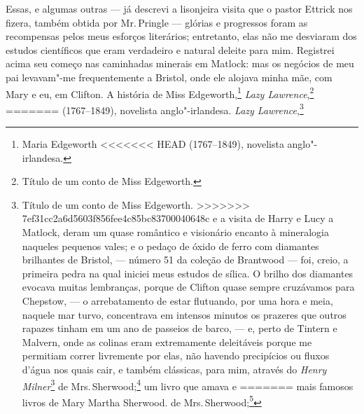 {{{{{{{{{{{{{{{{{{{{{{{%
Essas, e algumas outras --- já descrevi a lisonjeira visita que o
pastor Ettrick nos fizera, também obtida por Mr.\,Pringle --- glórias e
progressos foram as recompensas pelos meus esforços literários;
entretanto, elas não me desviaram dos estudos científicos que eram
verdadeiro e natural deleite para mim. Registrei acima seu começo nas
caminhadas minerais em Matlock: mas os negócios de meu pai levavam"-me
frequentemente a Bristol, onde ele alojava minha mãe, com Mary e eu, em
Clifton. A história de Miss Edgeworth,\footnote{Maria Edgeworth
<<<<<<< HEAD
  (1767--1849), novelista anglo"-irlandesa.} \textit{Lazy
Lawrence},\footnote{Título de um conto de Miss Edgeworth.}
=======
  (1767--1849), novelista anglo"-irlandesa.  \textit{Lazy
Lawrence},\footnote{Título de um conto de Miss Edgeworth. 
>>>>>>> 7ef31cc2a6d5603f856fee4c85bc83700040648c
e a visita de Harry e Lucy a Matlock, deram um quase romântico e
visionário encanto à mineralogia naqueles pequenos vales; e o pedaço de
óxido de ferro com diamantes brilhantes de Bristol, --- número 51 da coleção
de Brantwood --- foi, creio, a primeira pedra na qual iniciei meus
estudos de sílica. O brilho dos diamantes evocava muitas lembranças,
porque de Clifton quase sempre cruzávamos para Chepstow, --- o
arrebatamento de estar flutuando, por uma hora e meia, naquele mar
turvo, concentrava em intensos minutos os prazeres que outros rapazes
tinham em um ano de passeios de barco, --- e, perto de Tintern e Malvern,
onde as colinas eram extremamente deleitáveis porque me permitiam correr
livremente por elas, não havendo precipícios ou fluxos d'água nos quais
cair, e também clássicas, para mim, através do \textit{Henry
Milner}\footnote{\textit{The History of Henry Milner}: título de um dos
<<<<<<< HEAD
  mais famosos livros de Mary Martha Sherwood.} de Mrs.\,Sherwood;\footnote{Mary Martha Sherwood (1775--1851), prolífica escritora
  inglesa de histórias infantis.} um livro que amava e
=======
  mais famosos livros de Mary Martha Sherwood.  de Mrs.\,Sherwood;\footnote{Mary Martha Sherwood (1775--1851), prolífica escritora
  inglesa de histórias infantis.  um livro que amava e
>>>>>>> 7ef31cc2a6d5603f856fee4c85bc83700040648c
respeitava há muito tempo. Havia isso de curioso e valioso em minha
educação naqueles anos, que meu espírito aventureiro era sempre
ratificado pela chancela da localidade --- e que o encanto de cada
localidade era espiritualizado pelo ardor e pela paixão pela aventura.

}}}}}}}}}}}}}}}}}}}}}}}}}
